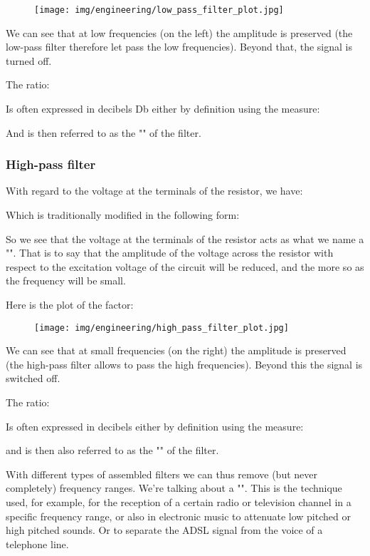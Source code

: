 	\begin{figure}[H]
		\centering
		\texttt{[image: img/engineering/low\_pass\_filter\_plot.jpg]}
	\end{figure}
	We can see that at low frequencies (on the left) the amplitude is preserved (the low-pass filter therefore let pass the low frequencies). Beyond that, the signal is turned off.
	
	The ratio:
	
	Is often expressed in decibels Db either by definition using the measure:
	
	And is then referred to as the "" of the filter.
	
	\subsubsection{High-pass filter}
	With regard to the voltage at the terminals of the resistor, we have:
	
	Which is traditionally modified in the following form:
	
	So we see that the voltage at the terminals of the resistor acts as what we name a "". That is to say that the amplitude of the voltage across the resistor with respect to the excitation voltage of the circuit will be reduced, and the more so as the frequency will be small.

	Here is the plot of the factor:
	
	\begin{figure}[H]
		\centering
		\texttt{[image: img/engineering/high\_pass\_filter\_plot.jpg]}
	\end{figure}
	We can see that at small frequencies (on the right) the amplitude is preserved (the high-pass filter allows to pass the high frequencies). Beyond this the signal is switched off.

	The ratio:
	
	Is often expressed in decibels either by definition using the measure:
	
	and is then also referred to as the "" of the filter.

	With different types of assembled filters we can thus remove (but never completely) frequency ranges. We're talking about a "". This is the technique used, for example, for the reception of a certain radio or television channel in a specific frequency range, or also in electronic music to attenuate low pitched or high pitched sounds. Or to separate the ADSL signal from the voice of a telephone line.

